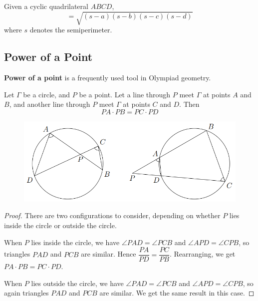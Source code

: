 \begin{theorem} 
Given a cyclic quadrilateral $ABCD$, 
\begin{equation}
[ABCD]=\sqrt{(s-a)(s-b)(s-c)(s-d)} 
\end{equation}
where $s$ denotes the semiperimeter.
\end{theorem}
\pagebreak

\subsection{Power of a Point} %
\textbf{Power of a point} is a frequently used tool in Olympiad geometry.

\begin{theorem}
Let $\Gamma$ be a circle, and $P$ be a point. Let a line through $P$ meet $\Gamma$ at points $A$ and $B$, and another line through $P$ meet $\Gamma$ at points $C$ and $D$. Then 
\begin{equation}
PA \cdot PB = PC \cdot PD
\end{equation} 
\end{theorem}

\begin{figure}[H]
    \centering
    \includegraphics[width=12cm]{images/Power_of_a_point.png}
\end{figure}

\begin{proof}
There are two configurations to consider, depending on whether $P$ lies inside the circle or outside the circle.

When $P$ lies inside the circle, we have $\angle PAD = \angle PCB$ and $\angle APD = \angle CPB$, so triangles $PAD$ and $PCB$ are similar. Hence $\dfrac{PA}{PD} = \dfrac{PC}{PB}$. Rearranging, we get $PA \cdot PB = PC \cdot PD$.

When $P$ lies outside the circle, we have $\angle PAD = \angle PCB$ and $\angle APD = \angle CPB$, so again triangles $PAD$ and $PCB$ are similar. We get the same result in this case.
\end{proof}

